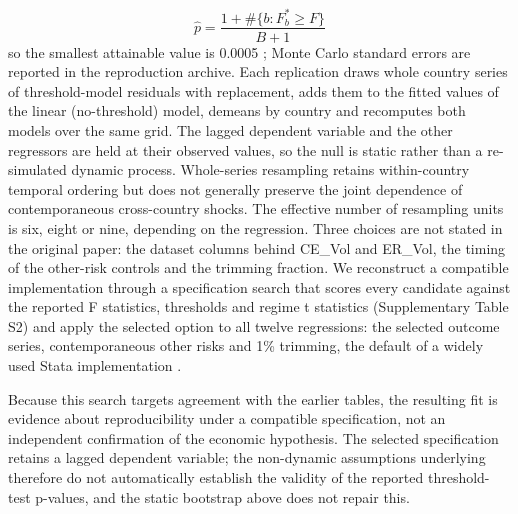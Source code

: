 \documentclass[preprint,12pt,authoryear]{elsarticle}
\begin{document}
\begin{equation}\label{eq:p}
\hat p = \frac{1 + \#\{b : F^{*}_b \ge F\}}{B + 1}
\end{equation}
so the smallest attainable value is 0.0005 \citep{davison1997}; Monte Carlo standard errors are reported in the reproduction archive. Each replication draws whole country series of threshold-model residuals with replacement, adds them to the fitted values of the linear (no-threshold) model, demeans by country and recomputes both models over the same grid. The lagged dependent variable and the other regressors are held at their observed values, so the null is static rather than a re-simulated dynamic process. Whole-series resampling retains within-country temporal ordering but does not generally preserve the joint dependence of contemporaneous cross-country shocks. The effective number of resampling units is six, eight or nine, depending on the regression. Three choices are not stated in the original paper: the dataset columns behind CE\_Vol and ER\_Vol, the timing of the other-risk controls and the trimming fraction. We reconstruct a compatible implementation through a specification search that scores every candidate against the reported F statistics, thresholds and regime t statistics (Supplementary Table S2) and apply the selected option to all twelve regressions: the selected outcome series, contemporaneous other risks and 1\% trimming, the default of a widely used Stata implementation \citep{wang2015}.

Because this search targets agreement with the earlier tables, the resulting fit is evidence about reproducibility under a compatible specification, not an independent confirmation of the economic hypothesis. The selected specification retains a lagged dependent variable; the non-dynamic assumptions underlying \citep{hansen1999} therefore do not automatically establish the validity of the reported threshold-test p-values, and the static bootstrap above does not repair this.
\end{document}
